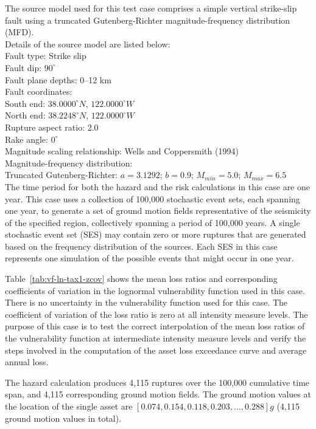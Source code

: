 The source model used for this test case comprises a simple vertical strike-slip fault using a truncated Gutenberg-Richter magnitude-frequency distribution (MFD).\\

\noindent Details of the source model are listed below:\\

\noindent
Fault type: Strike slip\\
Fault dip: $90^{\circ}$\\
Fault plane depths: 0--12 km\\
Fault coordinates:\\
South end: $38.0000^{\circ} N$, $122.0000^{\circ} W$\\
North end: $38.2248^{\circ} N$, $122.0000^{\circ} W$\\
Rupture aspect ratio: 2.0\\
Rake angle: $0^{\circ}$\\
Magnitude scaling relationship: Wells and Coppersmith (1994)\\
Magnitude-frequency distribution:\\
Truncated Gutenberg-Richter: $a = 3.1292$; $b = 0.9$; $M_{min} = 5.0$; $M_{max} = 6.5$\\

The time period for both the hazard and the risk calculations in this case are one year. This case uses a collection of 100,000 stochastic event sets, each spanning one year, to generate a set of ground motion fields representative of the seismicity of the specified region, collectively spanning a period of 100,000 years. A single stochastic event set (SES) may contain zero or more ruptures that are generated based on the frequency distribution of the sources. Each SES in this case represents one simulation of the possible events that might occur in one year.

Table~\ref{tab:vf-ln-tax1-zcov} shows the mean loss ratios and corresponding coefficients of variation in the lognormal vulnerability function used in this case. There is no uncertainty in the vulnerability function used for this case. The coefficient of variation of the loss ratio is zero at all intensity measure levels. The purpose of this case is to test the correct interpolation of the mean loss ratios of the vulnerability function at intermediate intensity measure levels and verify the steps involved in the computation of the asset loss exceedance curve and average annual loss.

The hazard calculation produces 4,115 ruptures over the 100,000 cumulative time span, and 4,115 corresponding ground motion fields. The ground motion values at the location of the single asset are $[0.074, 0.154, 0.118, 0.203, \dots, 0.288] g$ (4,115 ground motion values in total).

